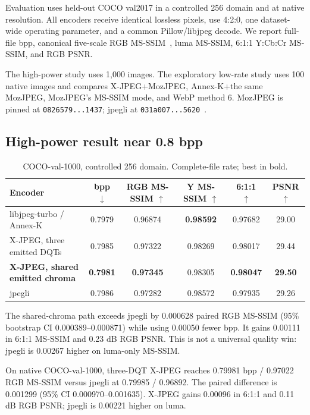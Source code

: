 \documentclass[10pt,twocolumn]{article}
\newcommand{\xjpeg}{X-JPEG}
\newcommand{\msssim}{MS-SSIM}
\begin{document}
Evaluation uses held-out COCO val2017 in a controlled 256 domain and at native resolution. All encoders receive identical lossless pixels, use 4:2:0, one dataset-wide operating parameter, and a common Pillow/libjpeg decode. We report full-file bpp, canonical five-scale RGB \msssim{}~\cite{wang2003msssim}, luma \msssim{}, 6:1:1 Y:Cb:Cr \msssim{}, and RGB PSNR.

The high-power study uses 1,000 images. The exploratory low-rate study uses 100 native images and compares \xjpeg{}+MozJPEG, Annex-K+the same MozJPEG, MozJPEG's MS-SSIM mode, and WebP method 6. MozJPEG is pinned at \texttt{0826579...1437}; jpegli at \texttt{031a007...5620}~\cite{jpegli}.

\subsection{High-power result near 0.8 bpp}

\begin{table}[t]
\centering
\caption{COCO-val-1000, controlled 256 domain. Complete-file rate; best in bold.}
\label{tab:highpower}
\small
\begin{tabular}{lccccc}
\toprule
Encoder & bpp $\downarrow$ & RGB \msssim{} $\uparrow$ & Y \msssim{} $\uparrow$ & 6:1:1 $\uparrow$ & PSNR $\uparrow$ \\
\midrule
libjpeg-turbo / Annex-K & 0.7979 & 0.96874 & \textbf{0.98592} & 0.97682 & 29.00 \\
\xjpeg{}, three emitted DQTs & 0.7985 & 0.97322 & 0.98269 & 0.98017 & 29.44 \\
\textbf{\xjpeg{}, shared emitted chroma} & \textbf{0.7981} & \textbf{0.97345} & 0.98305 & \textbf{0.98047} & \textbf{29.50} \\
jpegli & 0.7986 & 0.97282 & 0.98572 & 0.97935 & 29.26 \\
\bottomrule
\end{tabular}
\end{table}

The shared-chroma path exceeds jpegli by 0.000628 paired RGB \msssim{} (95\% bootstrap CI 0.000389--0.000871) while using 0.00050 fewer bpp. It gains 0.00111 in 6:1:1 \msssim{} and 0.23 dB RGB PSNR. This is not a universal quality win: jpegli is 0.00267 higher on luma-only \msssim{}.

On native COCO-val-1000, three-DQT \xjpeg{} reaches 0.79981 bpp / 0.97022 RGB \msssim{} versus jpegli at 0.79985 / 0.96892. The paired difference is 0.001299 (95\% CI 0.000970--0.001635). \xjpeg{} gains 0.00096 in 6:1:1 and 0.11 dB RGB PSNR; jpegli is 0.00221 higher on luma.
\end{document}
